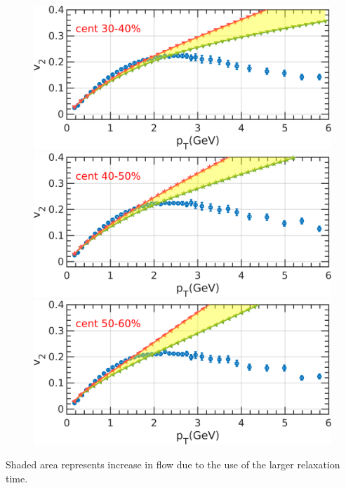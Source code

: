 \documentclass[aspectratio=1610]{beamer}
\begin{document}
\begin{frame}
\begin{figure}
\includegraphics[scale=0.19]{figs/3DGeometric/v2_pT30-40.png}
\includegraphics[scale=0.19]{figs/3DGeometric/v2_pT40-50.png}
\includegraphics[scale=0.19]{figs/3DGeometric/v2_pT50-60.png}
\end{figure}

Shaded area represents increase in flow due to the use of the larger relaxation time.


\end{frame}

\end{document}
